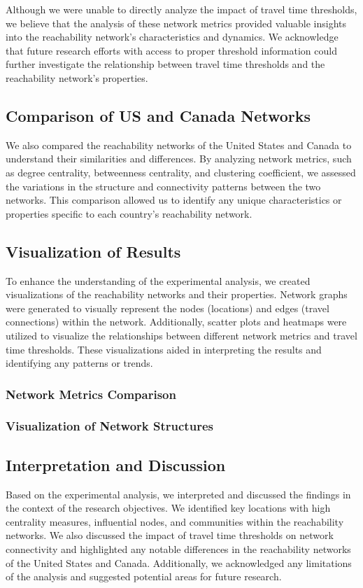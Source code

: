 Although we were unable to directly analyze the impact of travel time thresholds, we believe that the analysis of these network metrics provided valuable insights into the reachability network's characteristics and dynamics. We acknowledge that future research efforts with access to proper threshold information could further investigate the relationship between travel time thresholds and the reachability network's properties.

\subsection{Comparison of US and Canada Networks}

We also compared the reachability networks of the United States and Canada to understand their similarities and differences. By analyzing network metrics, such as degree centrality, betweenness centrality, and clustering coefficient, we assessed the variations in the structure and connectivity patterns between the two networks. This comparison allowed us to identify any unique characteristics or properties specific to each country's reachability network.

\subsection{Visualization of Results}

To enhance the understanding of the experimental analysis, we created visualizations of the reachability networks and their properties. Network graphs were generated to visually represent the nodes (locations) and edges (travel connections) within the network. Additionally, scatter plots and heatmaps were utilized to visualize the relationships between different network metrics and travel time thresholds. These visualizations aided in interpreting the results and identifying any patterns or trends.

\subsubsection{Network Metrics Comparison}

\subsubsection{ Visualization of Network Structures}

\subsection{Interpretation and Discussion}

Based on the experimental analysis, we interpreted and discussed the findings in the context of the research objectives. We identified key locations with high centrality measures, influential nodes, and communities within the reachability networks. We also discussed the impact of travel time thresholds on network connectivity and highlighted any notable differences in the reachability networks of the United States and Canada. Additionally, we acknowledged any limitations of the analysis and suggested potential areas for future research.
